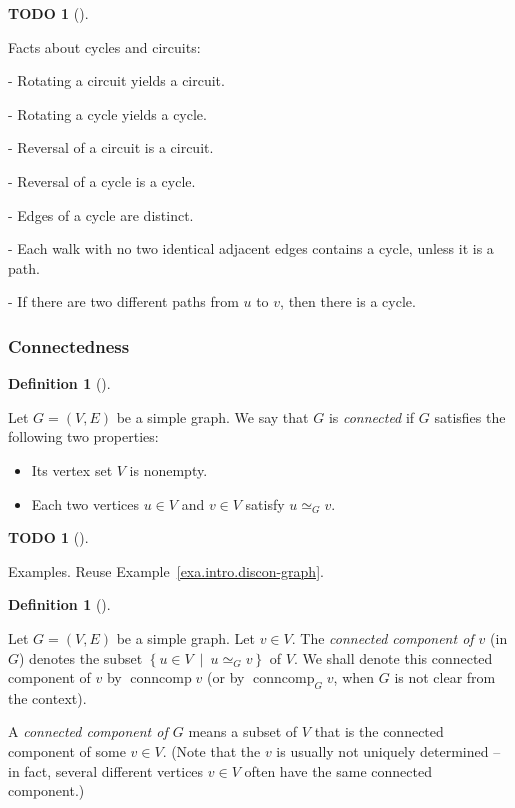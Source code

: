 \documentclass[numbers=enddot,12pt,final,onecolumn,notitlepage]{scrartcl}%
\theoremstyle{definition}
\newtheorem{defi}[theo]{Definition}
\newenvironment{definition}[1][]
{\begin{defi}[#1]\begin{leftbar}}
{\end{leftbar}\end{defi}}
\newtheorem{quest}[theo]{TODO}
\newenvironment{todo}[1][]
{\begin{quest}[#1]\begin{leftbar}}
{\end{leftbar}\end{quest}}
\newcommand{\conncomp}{\operatorname{conncomp}}
\newcommand{\set}[1]{\left\{ #1 \right\}}
\newcommand{\tup}[1]{\left( #1 \right)}
\begin{document}
\begin{todo}
Facts about cycles and circuits:

- Rotating a circuit yields a circuit.

- Rotating a cycle yields a cycle.

- Reversal of a circuit is a circuit.

- Reversal of a cycle is a cycle.

- Edges of a cycle are distinct.

- Each walk with no two identical adjacent edges contains a cycle,
  unless it is a path.

- If there are two different paths from $u$ to $v$, then there is a
  cycle.
\end{todo}

\subsubsection{\label{subsect.intro.connected}Connectedness}

\begin{definition}
Let $G = \tup{V, E}$ be a simple graph. We say that $G$ is
\textit{connected} if $G$ satisfies the following two properties:
\begin{itemize}
\item Its vertex set $V$ is nonempty.
\item Each two vertices $u \in V$ and $v \in V$ satisfy
$u \simeq_G v$.
\end{itemize}
\end{definition}

\begin{todo}
Examples. Reuse Example~\ref{exa.intro.discon-graph}.
\end{todo}

\begin{definition}
Let $G = \tup{V, E}$ be a simple graph. Let $v \in V$. The
\textit{connected component of $v$} (in $G$) denotes the subset
$\set{ u \in V \ \mid \  u \simeq_G v }$ of $V$.
We shall denote this connected component of $v$ by
$\conncomp v$ (or by $\conncomp_G v$, when $G$ is not clear from the
context).

A \textit{connected component of $G$} means a subset of $V$ that is
the connected component of some $v \in V$. (Note that the $v$ is
usually not uniquely determined -- in fact, several different vertices
$v \in V$ often have the same connected component.)
\end{definition}
\end{document}
